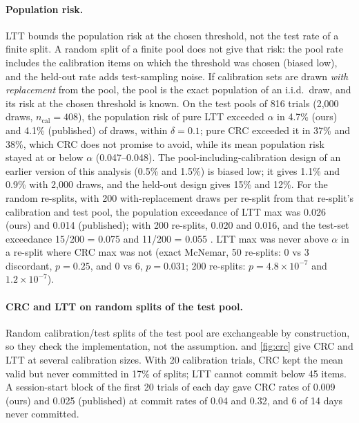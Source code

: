 \paragraph{Population risk.} LTT bounds the population risk at the chosen threshold, not the test rate of a finite split. A random split of a finite pool does not give that risk: the pool rate includes the calibration items on which the threshold was chosen (biased low), and the held-out rate adds test-sampling noise. If calibration sets are drawn \emph{with replacement} from the pool, the pool is the exact population of an i.i.d.\ draw, and its risk at the chosen threshold is known. On the test pools of 816 trials (2,000 draws, $n_{\mathrm{cal}} = 408$), the population risk of pure LTT exceeded $\alpha$ in 4.7\%  (ours) and 4.1\%  (published) of draws, within $\delta = 0.1$; pure CRC exceeded it in 37\% and 38\%, which CRC does not promise to avoid, while its mean population risk stayed at or below $\alpha$ (0.047--0.048). The pool-including-calibration design of an earlier version of this analysis (0.5\% and 1.5\%) is biased low; it gives 1.1\% and 0.9\% with 2,000 draws, and the held-out design gives 15\% and 12\%. For the random re-splits, with 200 with-replacement draws per re-split from that re-split's calibration and test pool, the population exceedance of LTT max was 0.026 (ours) and 0.014 (published); with 200 re-splits, 0.020 and 0.016, and the test-set exceedance 15/200 = 0.075  and 11/200 = 0.055 . LTT max was never above $\alpha$ in a re-split where CRC max was not (exact McNemar, 50 re-splits: 0 vs 3 discordant, $p = 0.25$, and 0 vs 6, $p = 0.031$; 200 re-splits: $p = 4.8 \times 10^{-7}$ and $1.2 \times 10^{-7}$).

\paragraph{CRC and LTT on random splits of the test pool.} Random calibration/test splits of the test pool are exchangeable by construction, so they check the implementation, not the assumption.  and \cref{fig:crc} give CRC and LTT at several calibration sizes. With 20 calibration trials, CRC kept the mean valid but never committed in 17\% of splits; LTT cannot commit below 45 items. A session-start block of the first 20 trials of each day gave CRC rates of 0.009 (ours) and 0.025 (published) at commit rates of 0.04 and 0.32, and 6 of 14 days never committed.

